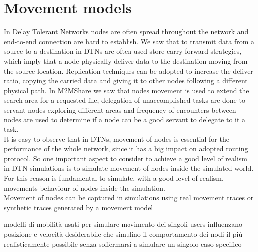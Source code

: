 
\chapter{Movement models}\label{movimento} %





In Delay Tolerant Networks nodes are often spread throughout the network and end-to-end connection are hard to establish. We saw that to transmit data from a source to a destination in DTNs are often used store-carry-forward strategies, which imply that a node physically deliver data to the destination moving from the source location. Replication techniques can be adopted to increase the deliver ratio, copying the carried data and giving it to other nodes following a different physical path. In M2MShare we saw that nodes movement is used to extend the search area for a requested file, delegation of unaccomplished tasks are done to servant nodes exploring different areas and frequency of encounters between nodes are used to determine if a node can be a good servant to delegate to it a task.
\\

It is easy to observe that in DTNs, movement of nodes is essential for the performance of the whole network, since it has a big impact on adopted routing protocol. So one important aspect to consider to achieve a good level of realism in DTN simulations is to simulate movement of nodes inside the simulated world.  For this reason is fundamental to simulate, with a good level of realism, movements behaviour of nodes inside the simulation. 
\\

Movement of nodes can be captured in simulations using real movement traces or synthetic traces generated by a movement model

modelli di mobilità usati per simulare movimento dei singoli users 
influenzano posizione e velocità
desiderabile che simulino il comportamento dei nodi il più realisticamente possibile
senza soffermarsi a simulare un singolo caso specifico


